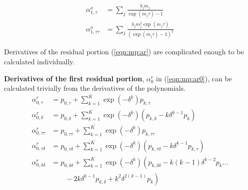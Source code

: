\begin{subequations}
\begin{align}
\alpha^o_{1,\tau} &= \sum_j \frac{b_j m_j}{\exp(m_j \tau) - 1}\\
\alpha^o_{1,\tau\tau} &= \sum_j \frac{b_j m_j^2 \exp(m_j \tau)}{(\exp(m_j \tau) - 1)^{2}}
\end{align}
\end{subequations}

Derivatives of the residual portion (\ref{eqn:mp:ar}) are complicated enough to be calculated individually.  

\textbf{Derivatives of the first residual portion}, $\alpha^r_0$ in (\ref{eqn:mp:ar0}), can be calculated trivially from the derivatives of the polynomials. 
\begin{subequations}
\begin{align}
\alpha^r_{0,\tau} &= p_{0,\tau} + \sum_{k=1}^K \exp\left( -\delta^k \right) p_{k,\tau}\\
\alpha^r_{0,\delta} &= p_{0,\delta} + \sum_{k=1}^K \exp\left(-\delta^k\right) \left(p_{k,\delta} - k \delta^{k-1} p_k\right)\\
\alpha^r_{0,\tau\tau} &= p_{0,\tau\tau} + \sum_{k=1}^K \exp\left( -\delta^k \right) p_{k,\tau\tau}\\
\alpha^r_{0,\tau\delta} &= p_{0,\tau\delta} + \sum_{k=1}^K \exp\left(-\delta^k\right) \left(p_{k,\tau\delta} - k \delta^{k-1} p_{k,\tau}\right)\\
\alpha^r_{0,\delta\delta} &= p_{0,\delta\delta} + \sum_{k=1}^K \exp\left(-\delta^k\right) \left(p_{k,\delta\delta} -k(k-1) \delta^{k-2} p_{k} \right. \ldots\nonumber\\
 &\left. \hspace{2em} - 2k\delta^{k-1}p_{k,\delta} +  k^2 \delta^{2(k-1)} p_k\right)
\end{align}
\end{subequations}

